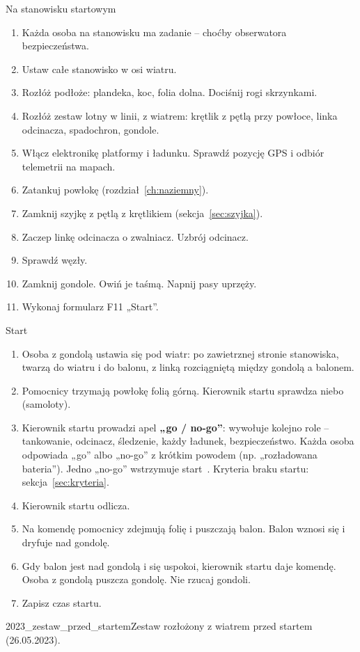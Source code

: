 \begin{sekcja}{Na stanowisku startowym}\label{sec:montaz-stanowisko}
\begin{enumerate}
  \item Każda osoba na stanowisku ma zadanie -- choćby obserwatora bezpieczeństwa.
  \item Ustaw całe stanowisko w osi wiatru.
  \item Rozłóż podłoże: plandeka, koc, folia dolna. Dociśnij rogi skrzynkami.
  \item Rozłóż zestaw lotny w linii, z wiatrem: krętlik z pętlą przy powłoce, linka odcinacza, spadochron, gondole.
  \item Włącz elektronikę platformy i ładunku. Sprawdź pozycję GPS i odbiór telemetrii na mapach.
  \item Zatankuj powłokę (rozdział~\ref{ch:naziemny}).
  \item Zamknij szyjkę z pętlą z krętlikiem (sekcja~\ref{sec:szyjka}).
  \item Zaczep linkę odcinacza o zwalniacz. Uzbrój odcinacz.
  \item Sprawdź węzły.
  \item Zamknij gondole. Owiń je taśmą. Napnij pasy uprzęży.
  \item Wykonaj formularz F11 „Start”.
\end{enumerate}
\end{sekcja}

\begin{sekcja}{Start}\label{sec:start}
\begin{enumerate}
  \item Osoba z gondolą ustawia się pod wiatr: po zawietrznej stronie stanowiska, twarzą do wiatru i do balonu, z linką rozciągniętą między gondolą a balonem.
  \item Pomocnicy trzymają powłokę folią górną. Kierownik startu sprawdza niebo (samoloty).
  \item Kierownik startu prowadzi apel \textbf{„go / no-go”}: wywołuje kolejno role -- tankowanie, odcinacz, śledzenie, każdy ładunek, bezpieczeństwo. Każda osoba odpowiada „go” albo „no-go” z krótkim powodem (np. „rozładowana bateria”). Jedno „no-go” wstrzymuje start~\cite[rozdz.~2]{nasahb}. Kryteria braku startu: sekcja~\ref{sec:kryteria}.
  \item Kierownik startu odlicza.
  \item Na komendę pomocnicy zdejmują folię i puszczają balon. Balon wznosi się i dryfuje nad gondolę.
  \item Gdy balon jest nad gondolą i się uspokoi, kierownik startu daje komendę. Osoba z gondolą puszcza gondolę. Nie rzucaj gondoli.
  \item Zapisz czas startu.
\end{enumerate}

{2023_zestaw_przed_startem}{Zestaw rozłożony z wiatrem przed startem (26.05.2023).}
\end{sekcja}
